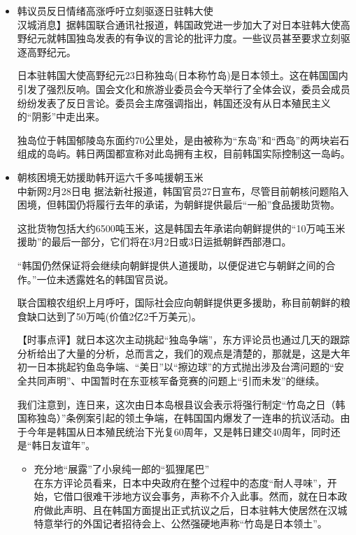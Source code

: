 \documentclass[a4paper,11pt]{article}
\begin{document}
\begin{itemize}
\begin{itemize}
\end{itemize} %

\item 韩议员反日情绪高涨呼吁立刻驱逐日驻韩大使\\
\label{sec-1_2}%
汉城消息】据韩国联合通讯社报道，韩国政党进一步加大了对日本驻韩大使高野纪元就韩国独岛发表的有争议的言论的批评力度。一些议员甚至要求立刻驱逐高野纪元。

   日本驻韩国大使高野纪元23日称独岛(日本称竹岛)是日本领土。这在韩国国内引发了强烈反响。国会文化和旅游业委员会今天举行了全体会议，委员会成员纷纷发表了反日言论。委员会主席强调指出，韩国还没有从日本殖民主义的“阴影”中走出来。

   独岛位于韩国郁陵岛东面约70公里处，是由被称为“东岛”和“西岛”的两块岩石组成的岛屿。韩日两国都宣称对此岛拥有主权，目前韩国实际控制这一岛屿。


\item 朝核困境无妨援助韩开运六千多吨援朝玉米\\
\label{sec-1_3}%
中新网2月28日电 据法新社报道，韩国官员27日宣布，尽管目前朝核问题陷入困境，但韩国仍将履行去年的承诺，为朝鲜提供最后“一船”食品援助货物。

   这批货物包括大约6500吨玉米，这是韩国去年承诺向朝鲜提供的“10万吨玉米援助”的最后一部分，它们将在3月2日或3日运抵朝鲜西部港口。

   “韩国仍然保证将会继续向朝鲜提供人道援助，以便促进它与朝鲜之间的合作。”一位未透露姓名的韩国官员说。

   联合国粮农组织上月呼吁，国际社会应向朝鲜提供更多援助，称目前朝鲜的粮食缺口达到了50万吨(价值2亿2千万美元)。

   【时事点评】就日本这次主动挑起“独岛争端”，东方评论员也通过几天的跟踪分析给出了大量的分析，总而言之，我们的观点是清楚的，那就是，这是大年初一日本挑起钓鱼岛争端、“美日”以“擦边球”的方式抛出涉及台湾问题的“安全共同声明”、中国暂时在东亚核军备竞赛的问题上“引而未发”的继续。

   我们注意到，连日来，这次由日本岛根县议会表示将强行制定“竹岛之日（韩国称独岛）”条例案引起的领土争端，在韩国国内爆发了一连串的抗议活动。由于今年是韩国从日本殖民统治下光复60周年，又是韩日建交40周年，同时还是“韩日友谊年”。
 
\begin{itemize}

\item 充分地“展露”了小泉纯一郎的“狐狸尾巴”\\
\label{sec-1_3_1}%
在东方评论员看来，日本中央政府在整个过程中的态度“耐人寻味”，开始，它借口很难干涉地方议会事务，声称不介入此事。然而，就在日本政府做此声明、且在韩国方面提出正式抗议之后，日本驻韩大使居然在汉城特意举行的外国记者招待会上、公然强硬地声称“竹岛是日本领土”。


\end{itemize}
\end{itemize}
\end{document}
